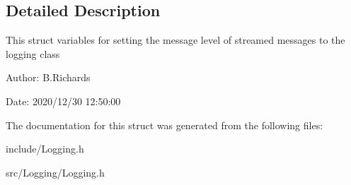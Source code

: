 \subsection{Detailed Description}
This struct variables for setting the message level of streamed messages to the logging class

\begin{DoxyParagraph}{Author\-:}
B.\-Richards 
\end{DoxyParagraph}
\begin{DoxyParagraph}{Date\-:}
2020/12/30 12\-:50\-:00 
\end{DoxyParagraph}


The documentation for this struct was generated from the following files\-:\begin{DoxyCompactItemize}
\item 
include/Logging.\-h\item 
src/\-Logging/Logging.\-h\end{DoxyCompactItemize}
